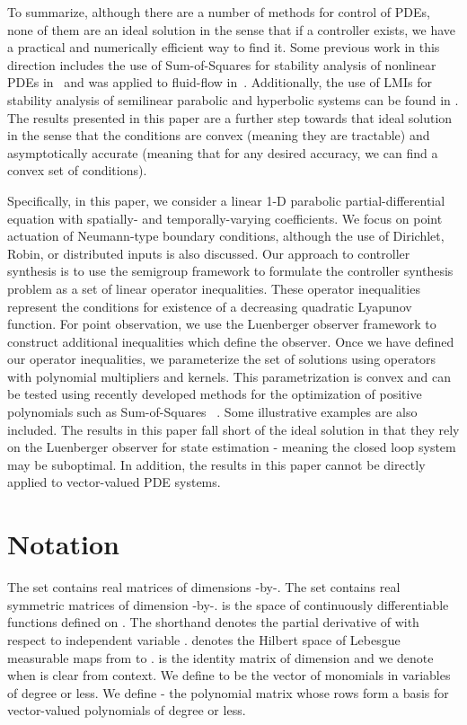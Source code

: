 \documentclass[9pt,journal,twocolumn]{IEEEtran}
\begin{document}
To summarize, although there are a number of methods for control of PDEs, none of them are an ideal solution in the sense that if a controller exists, we have a practical and numerically efficient way to find it. Some previous work in this direction includes the use of Sum-of-Squares for stability analysis of nonlinear PDEs in~\cite{papachristodoulou2005constructing} and was applied to fluid-flow in~\cite{tanaka2009sum}. Additionally, the use of LMIs for stability analysis of semilinear parabolic and hyperbolic systems can be found in \cite{fridman2009lmi}.
The results presented in this paper are a further step towards that ideal solution in the sense that the conditions are convex (meaning they are tractable) and asymptotically accurate (meaning that for any desired accuracy, we can find a convex set of conditions).

Specifically, in this paper, we consider a linear 1-D parabolic partial-differential equation with spatially- and temporally-varying coefficients. We focus on point actuation of Neumann-type boundary conditions, although the use of Dirichlet, Robin, or distributed inputs is also discussed. Our approach to controller synthesis is to use the semigroup framework to formulate the controller synthesis problem as a set of linear operator inequalities. These operator inequalities represent the conditions for existence of a decreasing quadratic Lyapunov function. For point observation, we use the Luenberger observer framework to construct additional inequalities which define the observer. Once we have defined our operator inequalities, we parameterize the set of solutions using operators with polynomial multipliers and kernels. This parametrization is convex and can be tested using recently developed methods for the optimization of positive polynomials such as Sum-of-Squares~ \cite{prajna2001introducing}. Some illustrative examples are also included. The results in this paper fall short of the ideal solution in that they rely on the Luenberger observer for state estimation - meaning the closed loop system may be suboptimal. In addition, the results in this paper cannot be directly applied to vector-valued PDE systems.

\section{Notation}\label{Prelim}
The set  contains real matrices of dimensions -by-. The set  contains real symmetric matrices of dimension -by-.  is the space of continuously differentiable functions defined on . The shorthand  denotes the partial derivative of  with respect to independent variable .  denotes the Hilbert space of Lebesgue measurable maps from  to .
 is the identity matrix of dimension  and we denote  when  is clear from context.
We define  to be the vector of monomials in variables  of degree  or less. We define  - the polynomial matrix whose rows form a basis for vector-valued polynomials of degree  or less.
\end{document}

